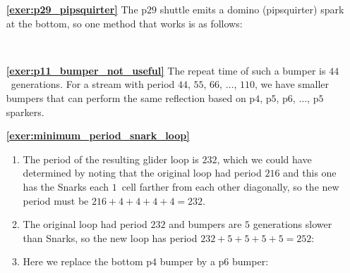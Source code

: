 \begin{multicols}{2}
\begin{itemize}[leftmargin=0em]
		\item[\bf\color{ocre}\sffamily\ref{exer:p29_pipsquirter}] The p$29$ shuttle emits a domino (pipsquirter) spark at the bottom, so one method that works is as follows:\\[-0.6em]
		
		\begin{center}
			\\
		\end{center}
	

		\item[\bf\color{ocre}\sffamily\ref{exer:p11_bumper_not_useful}] The repeat time of such a bumper is $44$~generations. For a stream with period $44$, $55$, $66$, $\ldots$, $110$, we have smaller bumpers that can perform the same reflection based on p$4$, p$5$, p$6$, $\ldots$, p$5$ sparkers.
		
		
		\clearpage
		
		
		\item[\bf\color{ocre}\sffamily\ref{exer:minimum_period_snark_loop}]
		\begin{enumerate}[leftmargin=1.5em,label=\bf\color{ocre}(\alph*)]
			\item The period of the resulting glider loop is $232$, which we could have determined by noting that the original loop had period $216$ and this one has the Snarks each $1$~cell farther from each other diagonally, so the new period must be $216+4+4+4+4 = 232$.
			
			\noindent\begin{center}
			\end{center}
			
			\item The original loop had period $232$ and bumpers are $5$ generations slower than Snarks, so the new loop has period $232+5+5+5+5 = 252$:
			
			\noindent\begin{center}
			\end{center}
			
			\item Here we replace the bottom p$4$ bumper by a p$6$ bumper:
			
			\noindent\begin{center}
			\end{center}
			

\end{enumerate}
\end{itemize}
\end{multicols}
